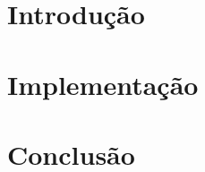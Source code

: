 \documentclass{article}
\begin{document}
\pagestyle{fancy} %
\lhead{\rightmark} %
\chead{} %
\rhead{\leftmark} %
 
\cfoot{\thepage} %
\renewcommand{\footrulewidth}{1pt}


\tableofcontents
\pagebreak
\pagebreak


\section{Introdução}


\section{Implementação}\label{sec:implementacao}



\section{Conclusão}
%
\end{document}
